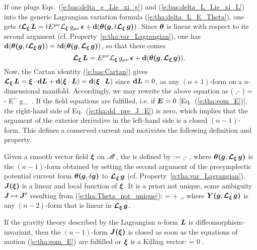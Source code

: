 If one plugs Eqs.~(\ref{e:bas:delta_g_Lie_xi_g}) and (\ref{e:bas:delta_L_Lie_xi_L})
into the generic Lagrangian variation formula (\ref{e:tha:delta_L_E_Theta}), one gets
$t \bm{\mathcal{L}}_{\bm{\xi}}\, \bm{L}  = t E^{\mu\nu} {\mathcal{L}}_{\bm{\xi}}\, g_{\mu\nu} \,\bm{\epsilon} + \mathbf{d}( \bm{\theta}\textbf{(}\bm{g},t\bm{\mathcal{L}}_{\bm{\xi}}\,\bm{g}\textbf{)})$.
Since $\bm{\theta}$ is linear with respect to its second argument (cf. Property~\ref{p:tha:var_Lagrangian}),
one has
$\mathbf{d}( \bm{\theta}\textbf{(}\bm{g},t\bm{\mathcal{L}}_{\bm{\xi}}\,\bm{g}\textbf{)}) =  t \mathbf{d}( \bm{\theta}\textbf{(}\bm{g},\bm{\mathcal{L}}_{\bm{\xi}}\,\bm{g}\textbf{)})$, so that there comes
\[
    \bm{\mathcal{L}}_{\bm{\xi}}\, \bm{L}  = E^{\mu\nu} {\mathcal{L}}_{\bm{\xi}}\, g_{\mu\nu} \,\bm{\epsilon} + \mathbf{d}( \bm{\theta}\textbf{(}\bm{g},\bm{\mathcal{L}}_{\bm{\xi}}\,\bm{g}\textbf{)}) .
\]
Now, the Cartan identity (\ref{e:bas:Cartan}) gives
$\bm{\mathcal{L}}_{\bm{\xi}}\, \bm{L} = \bm{\xi} \cdot\mathbf{d} \bm{L} + \mathbf{d}(\bm{\xi}\cdot\bm{L}) = \mathbf{d}(\bm{\xi}\cdot\bm{L})$
since $\mathbf{d} \bm{L} = 0$, as any $(n+1)$-form on a $n$-dimensional manifold.
Accordingly, we may rewrite the above equation as
\be \label{e:tha:dd_pre_J_E}
    \dd\left(  \w{\theta}\lld{},\Lie{\xi}\rld - \w{\xi}\cdot{} \right) =
    - E^{\mu\nu} \Liec{\xi} g_{\mu\nu} \,\weps .
\ee
If the field equations are fulfilled, i.e. if $\bm{E} = 0$ [Eq.~(\ref{e:tha:eom_E})], the
right-hand side of Eq.~(\ref{e:tha:dd_pre_J_E}) is zero, which implies that the
argument of the exterior derivative in the left-hand side is a closed
$(n-1)$-form. This defines a conserved current and motivates the following definition and property.

\begin{prop}
\label{p:tha:Noether_current}
Given a smooth vector field $\bm{\xi}$ on $\mathscr{M}$,
the  is defined by \cite{Wald93,IyerW94}
\be \label{e:tha:def_Noether_current}
    \lld\w{\xi}\rld := \w{\theta}\lld{},\Lie{\xi}\rld - \w{\xi}\cdot{} ,
\ee
where $\bm{\theta}\textbf{(}\bm{g},\bm{\mathcal{L}}_{\bm{\xi}}\,\bm{g}\textbf{)}$ is the $(n-1)$-form obtained by setting the second
argument of the presymplectic potential current form $\bm{\theta}\textbf{(}\bm{g},\delta\bm{g}\textbf{)}$
to $\bm{\mathcal{L}}_{\bm{\xi}}\,\bm{g}$ (cf. Property~\ref{p:tha:var_Lagrangian}).
$\bm{J}\textbf{(}\bm{\xi}\textbf{)}$ is a linear and local function of $\bm{\xi}$. It is a priori not unique,
some ambiguity $\bm{J}\mapsto \bm{J'}$ resulting from (\ref{e:tha:Theta_not_unique}):
\be \label{e:tha:J_not_unique}
     \lld\w{\xi}\rld =  \lld\w{\xi}\rld  + \dd {}\lld{},\Lie{\xi}\rld,
\ee
where $\bm{Y}\textbf{(}\bm{g},\bm{\mathcal{L}}_{\bm{\xi}}\,\bm{g}\textbf{)}$ is any $(n-2)$-form that is linear in $\bm{\mathcal{L}}_{\bm{\xi}}\,\bm{g}$.

If the gravity theory described by the Lagrangian $n$-form $\bm{L}$ is diffeomorphism-invariant, then
the $(n-1)$-form $\bm{J}\textbf{(}\bm{\xi}\textbf{)}$ is closed as soon as the equations of motion (\ref{e:tha:eom_E}) are fulfilled  or $\bm{\xi}$ is a Killing vector:
\be \label{e:tha:J_closed}
    \dd {}\lld\w{\xi}\rld  = 0 .
\ee
\end{prop}


